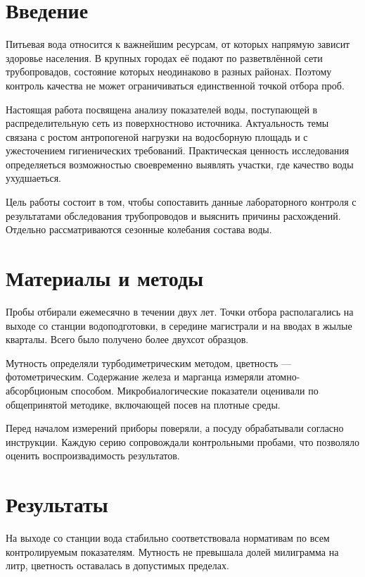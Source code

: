 \chapter{Введение}

Питьевая вода относится к важнейшим ресурсам, от которых напрямую зависит
здоровье населения. В крупных городах её подают по разветвлённой сети
трубопровадов, состояние которых неодинаково в разных районах. Поэтому контроль
качества не может ограничиваться единственной точкой отбора проб.

Настоящая работа посвящена анализу показателей воды, поступающей в
распределительную сеть из поверхностново источника. Актуальность темы связана с
ростом антропогеной нагрузки на водосборную площадь и с ужесточением
гигиенических требований. Практическая ценность исследования определяеться
возможностью своевременно выявлять участки, где качество воды ухудшаеться.

Цель работы состоит в том, чтобы сопоставить данные лабораторного контроля с
результатами обследования трубопроводов и выяснить причины расхождений. Отдельно
рассматриваются сезонные колебания состава воды.

\chapter{Материалы и методы}

Пробы отбирали ежемесячно в течении двух лет. Точки отбора располагались на
выходе со станции водоподготовки, в середине магистрали и на вводах в жылые
кварталы. Всего было получено более двухсот образцов.

Мутность определяли турбодиметрическим методом, цветность — фотометрическим.
Содержание железа и марганца измеряли атомно-абсорбционым способом.
Микробиалогические показатели оценивали по общепринятой методике, включающей
посев на плотные среды.

Перед началом измерений приборы поверяли, а посуду обрабатывали согласно
инструкции. Каждую серию сопровождали контрольными пробами, что позволяло
оценить воспроизвадимость результатов.

\chapter{Результаты}

На выходе со станции вода стабильно соответствовала нормативам по всем
контролируемым показателям. Мутность не превышала долей милиграмма на литр,
цветность оставалась в допустимых пределах.

